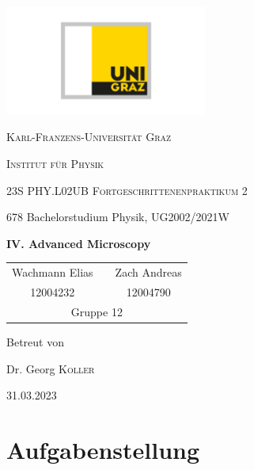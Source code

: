 \documentclass[ngerman]{scrartcl}
\begin{document}
\begin{titlepage}
    \centering
    \includegraphics[width=0.5\textwidth]{../../99_Misc/Logo_KF.pdf}\par\vspace{0.8cm}
    {\scshape\LARGE{Karl-Franzens-Universität Graz}\par}
    {\scshape\LARGE{Institut für Physik}\par}
    \vspace{1cm}
    {\scshape\Large{23S PHY.L02UB Fortgeschrittenenpraktikum 2}\par}
    678 Bachelorstudium Physik, UG2002/2021W\par
    \vspace{1.5cm}
    {\huge\bfseries IV. Advanced Microscopy\par}
    \vspace{2cm}
    \begin{table}[H]
        \centering
        \begin{tabular}{c c c}
            \Large Wachmann Elias &  & \Large Zach Andreas \\
            \Large 12004232       &  & \Large 12004790     \\
            \multicolumn{3}{c}{Gruppe 12}
        \end{tabular}
    \end{table}
    \vfill
    \Large Betreut von\par
    Dr. Georg \textsc{Koller}
    \vfill
    {\large 31.03.2023\par}
\end{titlepage}

\clearpage
\tableofcontents
\newpage

\section[Aufgabenstellung]{Aufgabenstellung \cite{ref:angabe}}
\label{sec:aufgabenstellung}
\end{document}
